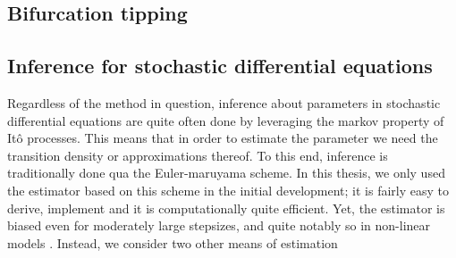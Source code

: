 \subsection{Bifurcation tipping}

\subsection{Inference for stochastic differential equations}
Regardless of the method in question, inference about parameters in stochastic differential equations are quite often done by leveraging the markov property of Itô processes. This means that in order to estimate the parameter we need the transition density or approximations thereof.
To this end, inference is traditionally done qua the Euler-maruyama scheme. In this thesis, we only used the estimator based on this scheme in the initial development; it is fairly easy to derive, implement and it is computationally quite efficient. Yet, the estimator is biased even for moderately large stepsizes, and quite notably so in non-linear models \cite{SplittingSchemes}. Instead, we consider two other means of estimation 
